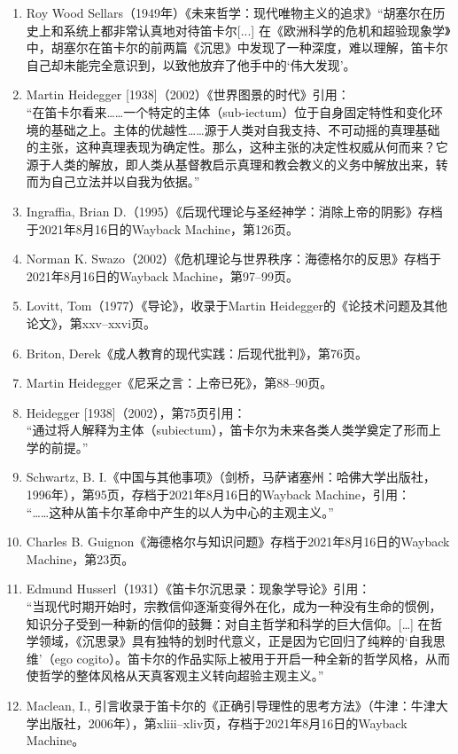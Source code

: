 \begin{enumerate}
\item Roy Wood Sellars（1949年）《未来哲学：现代唯物主义的追求》“胡塞尔在历史上和系统上都非常认真地对待笛卡尔[...] 在《欧洲科学的危机和超验现象学》中，胡塞尔在笛卡尔的前两篇《沉思》中发现了一种深度，难以理解，笛卡尔自己却未能完全意识到，以致他放弃了他手中的‘伟大发现’。
\item Martin Heidegger [1938]（2002）《世界图景的时代》引用：\\
“在笛卡尔看来……一个特定的主体（sub-iectum）位于自身固定特性和变化环境的基础之上。主体的优越性……源于人类对自我支持、不可动摇的真理基础的主张，这种真理表现为确定性。那么，这种主张的决定性权威从何而来？它源于人类的解放，即人类从基督教启示真理和教会教义的义务中解放出来，转而为自己立法并以自我为依据。”
\item Ingraffia, Brian D.（1995）《后现代理论与圣经神学：消除上帝的阴影》存档于2021年8月16日的Wayback Machine，第126页。
\item Norman K. Swazo（2002）《危机理论与世界秩序：海德格尔的反思》存档于2021年8月16日的Wayback Machine，第97–99页。
\item Lovitt, Tom（1977）《导论》，收录于Martin Heidegger的《论技术问题及其他论文》，第xxv–xxvi页。
\item Briton, Derek《成人教育的现代实践：后现代批判》，第76页。
\item Martin Heidegger《尼采之言：上帝已死》，第88–90页。
\item Heidegger [1938]（2002），第75页引用：\\
“通过将人解释为主体（subiectum），笛卡尔为未来各类人类学奠定了形而上学的前提。”
\item Schwartz, B. I.《中国与其他事项》（剑桥，马萨诸塞州：哈佛大学出版社，1996年），第95页，存档于2021年8月16日的Wayback Machine，引用：\\
“……这种从笛卡尔革命中产生的以人为中心的主观主义。”
\item Charles B. Guignon《海德格尔与知识问题》存档于2021年8月16日的Wayback Machine，第23页。
\item Edmund Husserl（1931）《笛卡尔沉思录：现象学导论》引用：\\
“当现代时期开始时，宗教信仰逐渐变得外在化，成为一种没有生命的惯例，知识分子受到一种新的信仰的鼓舞：对自主哲学和科学的巨大信仰。[…] 在哲学领域，《沉思录》具有独特的划时代意义，正是因为它回归了纯粹的‘自我思维’（ego cogito）。笛卡尔的作品实际上被用于开启一种全新的哲学风格，从而使哲学的整体风格从天真客观主义转向超验主观主义。”
\item Maclean, I., 引言收录于笛卡尔的《正确引导理性的思考方法》（牛津：牛津大学出版社，2006年），第xliii–xliv页，存档于2021年8月16日的Wayback Machine。

\end{enumerate}
